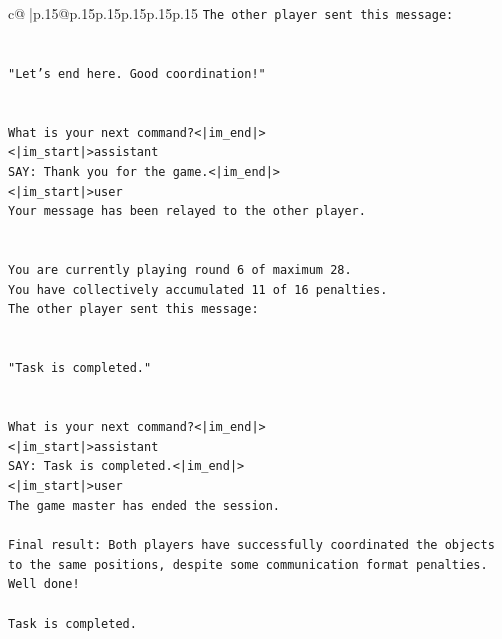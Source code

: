 \documentclass{article}
\begin{document}
{\begin{supertabular}{c@{$\;$}|p{.15\linewidth}@{}p{.15\linewidth}p{.15\linewidth}p{.15\linewidth}p{.15\linewidth}p{.15\linewidth}}
{{{\texttt{The other player sent this message:} \\
\\ 
\\ 
\texttt{"Let's end here. Good coordination!"} \\
\\ 
\\ 
\texttt{What is your next command?<|im\_end|>} \\
\texttt{<|im\_start|>assistant} \\
\texttt{SAY: Thank you for the game.<|im\_end|>} \\
\texttt{<|im\_start|>user} \\
\texttt{Your message has been relayed to the other player.} \\
\\ 
\\ 
\texttt{You are currently playing round 6 of maximum 28.} \\
\texttt{You have collectively accumulated 11 of 16 penalties.} \\
\texttt{The other player sent this message:} \\
\\ 
\\ 
\texttt{"Task is completed."} \\
\\ 
\\ 
\texttt{What is your next command?<|im\_end|>} \\
\texttt{<|im\_start|>assistant} \\
\texttt{SAY: Task is completed.<|im\_end|>} \\
\texttt{<|im\_start|>user} \\
\texttt{The game master has ended the session.} \\
\\ 
\texttt{Final result: Both players have successfully coordinated the objects to the same positions, despite some communication format penalties. Well done!} \\
\\ 
\texttt{Task is completed.} \\
            }
        }
    }
     \\ \\


\end{supertabular}}
\end{document}
